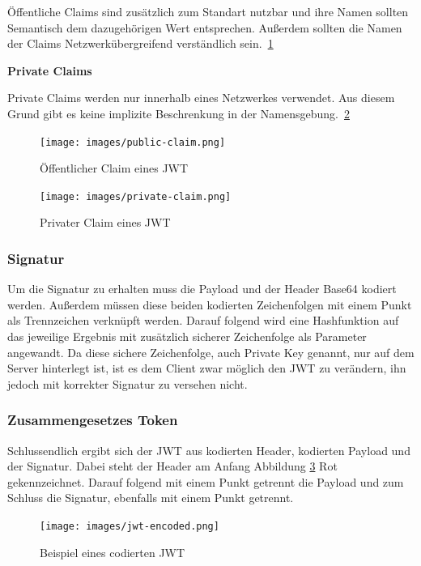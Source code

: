 \documentclass[11pt]{article}
\begin{document}
	Öffentliche Claims sind zusätzlich zum Standart nutzbar und ihre Namen sollten Semantisch dem dazugehörigen Wert entsprechen. Außerdem sollten die Namen der Claims Netzwerkübergreifend verständlich sein.~\ref{fig:public-claim}

	\noindent
	\textbf{Private Claims}

	Private Claims werden nur innerhalb eines Netzwerkes verwendet. Aus diesem Grund gibt es keine implizite Beschrenkung in der Namensgebung.~\ref{fig:private-claim}  
	
	\begin{figure}[h]
		\centering
		\texttt{[image: images/public-claim.png]}
		\caption{Öffentlicher Claim eines \gls{JWT} }
		\label{fig:public-claim}
	\end{figure}
	
	\begin{figure}[h]
		\centering
		\texttt{[image: images/private-claim.png]}
		\caption{Privater Claim eines \gls{JWT} }
		\label{fig:private-claim}
	\end{figure}
	
	\subsubsection{Signatur}
	\label{sec: jwt_signature}
	
	Um die Signatur zu erhalten muss die Payload und der Header Base64 kodiert werden. Außerdem müssen diese beiden kodierten Zeichenfolgen mit einem Punkt als Trennzeichen verknüpft werden. Darauf folgend wird eine Hashfunktion auf das jeweilige Ergebnis mit zusätzlich sicherer Zeichenfolge als Parameter angewandt. Da diese sichere Zeichenfolge, auch Private Key genannt, nur auf dem Server hinterlegt ist, ist es dem Client zwar möglich den \gls{JWT} zu verändern, ihn jedoch mit korrekter Signatur zu versehen nicht.
	
	\subsubsection{Zusammengesetzes Token}
	\label{sec: jwt_result}
	Schlussendlich ergibt sich der \gls{JWT} aus kodierten Header, kodierten Payload und der Signatur. Dabei steht der Header am Anfang Abbildung \ref{fig:jwt-encoded} Rot gekennzeichnet. Darauf folgend mit einem Punkt getrennt die Payload und zum Schluss die Signatur, ebenfalls mit einem Punkt getrennt.
	
	\begin{figure}[h]
		\texttt{[image: images/jwt-encoded.png]}
		\caption{Beispiel eines codierten \gls{JWT} }
		\label{fig:jwt-encoded}
	\end{figure}
	
\end{document}
